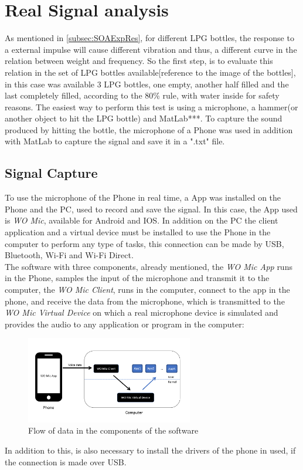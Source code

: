 



\section{Real Signal analysis}\label{sec:MIC}
As mentioned in \ref{subsec:SOAExpRes}, for different LPG bottles, the response to a external impulse will cause different vibration and thus, a different curve in the relation between weight and frequency. So the first step, is to evaluate this relation in the set of LPG bottles available[reference to the image of the bottles], in this case was available 3 LPG bottles, one empty, another half filled and the last completely filled, according to the 80\% rule, with water inside for safety reasons. The easiest way to perform this test is using a microphone, a hammer(or another object to hit the LPG bottle) and MatLab***. To capture the sound produced by hitting the bottle, the microphone of a Phone was used in addition with MatLab to capture the signal and save it in a ".txt" file.
    \subsection*{Signal Capture}
    To use the microphone of the Phone in real time, a App was installed on the Phone and the PC, used to record and save the signal. In this case, the App used is \textit{WO Mic}, available for Android and IOS. In addition on the PC the client application and a virtual device must be installed to use the Phone in the computer to perform any type of tasks, this connection can be made by USB, Bluetooth, Wi-Fi and Wi-Fi Direct.\\
    The software with three components, already mentioned, the \textit{WO Mic App} runs in the Phone, samples the input of the microphone and transmit it to the computer, the \textit{WO Mic Client}, runs in the computer, connect to the app in the phone, and receive the data from the microphone, which is transmitted to the \textit{WO Mic Virtual Device} on which a real microphone device is simulated and provides the audio to any application or program in the computer\cite{WOMicFREE}:\\
    \begin{figure}[!htb]
        \centering
        \includegraphics[width=0.65\textwidth]{Chapters/3CHP/Images/WOMICDiag.png}
        \caption{Flow of data in the components of the software\cite{WOMicFREE}}
        \label{fig:diagramWOMIC}
    \end{figure}
    In addition to this, is also necessary to install the drivers of the phone in used, if the connection is made over USB.
